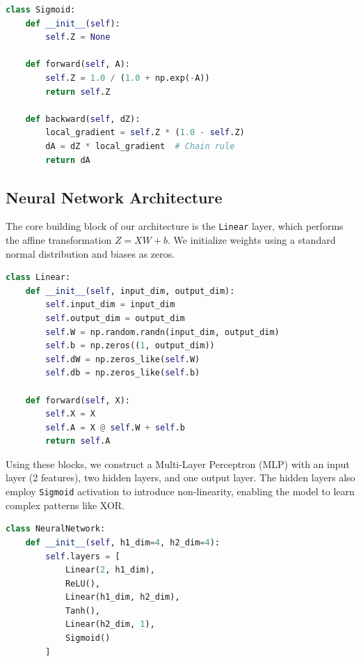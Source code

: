 \documentclass[10pt,twocolumn,letterpaper]{article}
\begin{document}
\begin{lstlisting}[language=Python, float]
class Sigmoid:
    def __init__(self):
        self.Z = None

    def forward(self, A):
        self.Z = 1.0 / (1.0 + np.exp(-A))
        return self.Z

    def backward(self, dZ):
        local_gradient = self.Z * (1.0 - self.Z)
        dA = dZ * local_gradient  # Chain rule
        return dA
\end{lstlisting}

\subsection{Neural Network Architecture}
The core building block of our architecture is the \texttt{Linear} layer, which performs the affine transformation $Z = XW + b$. We initialize weights using a standard normal distribution and biases as zeros.

\begin{lstlisting}[language=Python]
class Linear:
    def __init__(self, input_dim, output_dim):
        self.input_dim = input_dim
        self.output_dim = output_dim
        self.W = np.random.randn(input_dim, output_dim) 
        self.b = np.zeros((1, output_dim))
        self.dW = np.zeros_like(self.W)
        self.db = np.zeros_like(self.b)

    def forward(self, X):
        self.X = X 
        self.A = X @ self.W + self.b
        return self.A
\end{lstlisting}

Using these blocks, we construct a Multi-Layer Perceptron (MLP) with an input layer (2 features), two hidden layers, and one output layer. The hidden layers also employ \texttt{Sigmoid} activation to introduce non-linearity, enabling the model to learn complex patterns like XOR.

\begin{lstlisting}[language=Python, float]
class NeuralNetwork:
    def __init__(self, h1_dim=4, h2_dim=4):
        self.layers = [
            Linear(2, h1_dim),
            ReLU(),
            Linear(h1_dim, h2_dim),
            Tanh(),
            Linear(h2_dim, 1),
            Sigmoid()
        ]
\end{lstlisting}
\end{document}
